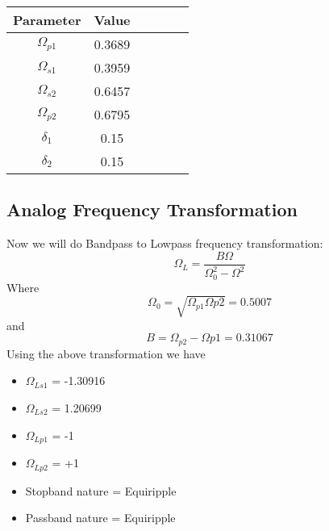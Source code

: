 \documentclass[12pt]{article}
\begin{document}
\begin{table}[h!]
		\begin{center}
		\begin{tabular}{|c|c|c|c|c|c|}
			\hline
			  Parameter & Value \\
			\hline
			 $\Omega_{p1}$& 0.3689\\
			\hline
			 $\Omega_{s1}$ & 0.3959\\
			\hline
			 $\Omega_{s2}$ & 0.6457\\
			\hline
		     $\Omega_{p2}$ & 0.6795\\
			\hline
		    $\delta_1$ & 0.15\\
		    \hline
		    $\delta_2$ & 0.15\\
		    \hline
		\end{tabular}
		\end{center}
\end{table}

\subsection{\textbf{Analog Frequency Transformation}}
Now we will do Bandpass to Lowpass frequency transformation:\\
\begin{equation*}
    \Omega_L = \frac{B\Omega}{\Omega_0^2-\Omega^2}
\end{equation*}
Where \\
\begin{equation*}
    \Omega_0 = \sqrt{\Omega_{p1}\Omega{p2}} = 0.5007
\end{equation*}
and\\
\begin{equation*}
    B = \Omega_{p2}-\Omega{p1} = 0.31067
\end{equation*}
Using the above transformation we have\\
\begin{itemize}
    \item $\Omega_{Ls1}$ = -1.30916
    \item $\Omega_{Ls2}$ = 1.20699
    \item $\Omega_{Lp1}$ = -1
    \item $\Omega_{Lp2}$ = +1
    \item Stopband nature = Equiripple
    \item Passband nature = Equiripple
\end{itemize}
\end{document}

